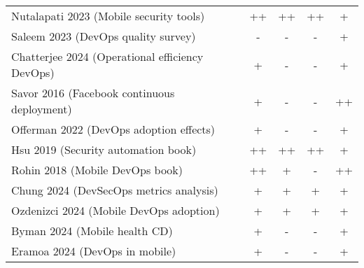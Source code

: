 \documentclass[bscthesis,finnish,oneside,biblatex]{uefcsthesis}
\begin{document}
\begin{table}[htbp]
\begin{tabular}{p{7cm}cccc}
    Nutalapati 2023 (Mobile security tools)             &  ++  &  ++ &  ++ &  +  \\
    Saleem 2023 (DevOps quality survey)                 &  -   &  -  &  -  &  +  \\
    Chatterjee 2024 (Operational efficiency DevOps)     &  +   &  -  &  -  &  +  \\
    Savor 2016 (Facebook continuous deployment)         &  +   &  -  &  -  &  ++ \\
    Offerman 2022 (DevOps adoption effects)             &  +   &  -  &  -  &  +  \\
    Hsu 2019 (Security automation book)                 &  ++  &  ++ &  ++ &  +  \\
    Rohin 2018 (Mobile DevOps book)                     &  ++  &  +  &  -  &  ++ \\
    Chung 2024 (DevSecOps metrics analysis)             &  +   &  +  &  +  &  +  \\
    Ozdenizci 2024 (Mobile DevOps adoption)             &  +   &  +  &  +  &  +  \\
    Byman 2024 (Mobile health CD)                       &  +   &  -  &  -  &  +  \\
    Eramoa 2024 (DevOps in mobile)                      &  +   &  -  &  -  &  +  \\
    \bottomrule
  \end{tabular}
\end{table}
\end{document}
